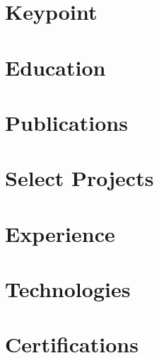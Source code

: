 \documentclass[11pt, letterpaper]{article}
\begin{document}
	
	
	
	
	\section{\faStar \ Keypoint}
	
	
	\section{\faUniversity\ Education}
	
	
	\section{\faNewspaper\ Publications}
	
	
	
	\section{\faCode\ Select Projects}
	
	
	\section{\faBriefcase\ Experience}
	
	
	
	\section{\faLaptop\ Technologies}
	
	
	\section{\faCertificate\ Certifications}
	
\end{document}
